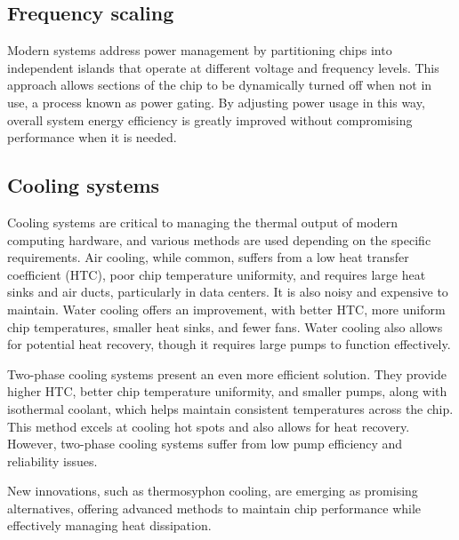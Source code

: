 \subsection{Frequency scaling}
Modern systems address power management by partitioning chips into independent islands that operate at different voltage and frequency levels. 
This approach allows sections of the chip to be dynamically turned off when not in use, a process known as power gating. 
By adjusting power usage in this way, overall system energy efficiency is greatly improved without compromising performance when it is needed.

\subsection{Cooling systems}
Cooling systems are critical to managing the thermal output of modern computing hardware, and various methods are used depending on the specific requirements. 
Air cooling, while common, suffers from a low heat transfer coefficient (HTC), poor chip temperature uniformity, and requires large heat sinks and air ducts, particularly in data centers.
It is also noisy and expensive to maintain. Water cooling offers an improvement, with better HTC, more uniform chip temperatures, smaller heat sinks, and fewer fans. 
Water cooling also allows for potential heat recovery, though it requires large pumps to function effectively.

Two-phase cooling systems present an even more efficient solution. 
They provide higher HTC, better chip temperature uniformity, and smaller pumps, along with isothermal coolant, which helps maintain consistent temperatures across the chip. 
This method excels at cooling hot spots and also allows for heat recovery. However, two-phase cooling systems suffer from low pump efficiency and reliability issues.

New innovations, such as thermosyphon cooling, are emerging as promising alternatives, offering advanced methods to maintain chip performance while effectively managing heat dissipation.